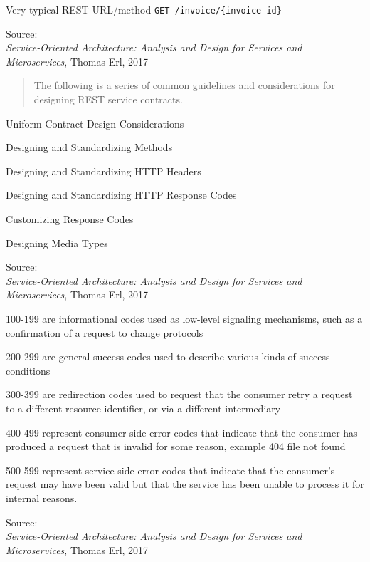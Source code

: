 \documentclass[Screen16to9,17pt]{foils}
\begin{document}



\begin{list2}
\item Very typical REST URL/method \verb+GET /invoice/{invoice-id}+
\end{list2}
Source: {\footnotesize\\
\emph{Service‑Oriented Architecture: Analysis and Design for Services and Microservices}, Thomas Erl, 2017}




\slide{}


\begin{quote}
The following is a series of common guidelines and considerations for designing REST service contracts.
\end{quote}


\begin{list2}
\item Uniform Contract Design Considerations
\item Designing and Standardizing Methods
\item Designing and Standardizing HTTP Headers
\item Designing and Standardizing HTTP Response Codes
\item Customizing Response Codes
\item Designing Media Types
\end{list2}
Source: {\footnotesize\\
\emph{Service‑Oriented Architecture: Analysis and Design for Services and Microservices}, Thomas Erl, 2017}



\begin{list2}
\item 100-199 are informational codes used as low-level signaling mechanisms, such as a confirmation of a request to change protocols
\item 200-299 are general success codes used to describe various kinds of success conditions
\item 300-399 are redirection codes used to request that the consumer retry a request to a different resource identifier, or via a different intermediary
\item 400-499 represent consumer-side error codes that indicate that the consumer has produced a request that is invalid for some reason, example 404 file not found
\item 500-599 represent service-side error codes that indicate that the consumer’s request may have been valid but that the service has been unable to process it for internal reasons.
\end{list2}
Source: {\footnotesize\\
\emph{Service‑Oriented Architecture: Analysis and Design for Services and Microservices}, Thomas Erl, 2017}
\end{document}
